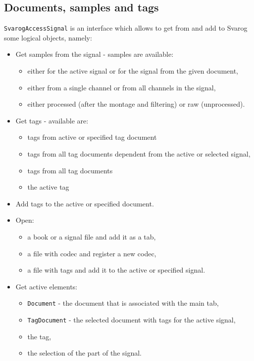 \documentclass{article}
\begin{document}
\subsection{Documents, samples and tags}
\label{signal}

\verb=SvarogAccessSignal= is an interface which allows to get from and add to Svarog some logical objects, namely:
\begin{itemize}
	\item Get samples from the signal - samples are available:
		\begin{itemize}
			\item either for the active signal or for the signal from the given document,
			\item either from a single channel or from all channels in the signal,
			\item either processed (after the montage and filtering) or raw (unprocessed).
		\end{itemize}
	\item Get tags - available are:
		\begin{itemize}
			\item tags from active or specified tag document
			\item tags from all tag documents dependent from the active or selected signal,
			\item tags from all tag documents
			\item the active tag
		\end{itemize}
	\item Add tags to the active or specified document.
	\item Open:
	\begin{itemize}
		\item a book or a signal file and add it as a tab,
		\item a file with codec and register a new codec,
		\item a file with tags and add it to the active or specified signal.
	\end{itemize}
	\item Get active elements:
		\begin{itemize}
			\item \verb=Document= - the document that is associated with the main tab,
			\item \verb=TagDocument= - the selected document with tags for the active signal,
			\item the tag,
			\item the selection of the part of the signal.
		\end{itemize}
\end{itemize}
\end{document}
